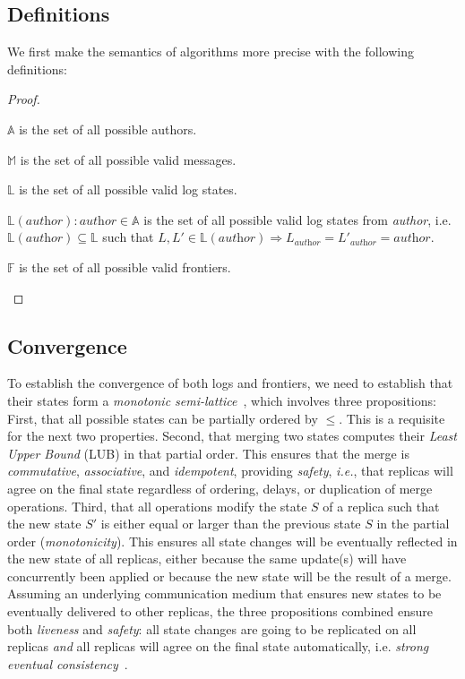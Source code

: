 \documentclass[9pt, oneside]{article}   	%
\begin{document}
\subsection{Definitions}

We first make the semantics of algorithms more precise with the following definitions:
\begin{proof}
	\begin{pfenum}
		\item $\mathds{A}$ is the set of all possible authors.
		\item $\mathds{M}$ is the set of all possible valid messages.
		\item $\mathds{L}$ is the set of all possible valid log states.
		\item $\mathds{L}(\textit{author}) : \textit{author} \in \mathds{A}$ is the set of all possible valid log states from \textit{author}, i.e. $\mathds{L}(\textit{author}) \subseteq \mathds{L}$ such that $L,L' \in \mathds{L}(\textit{author}) \Rightarrow L_\textit{author} = L'_\textit{author} = \textit{author}$.
		\item $\mathds{F}$ is the set of all possible valid frontiers.
	\end{pfenum}
\end{proof}

\subsection{Convergence}

To establish the convergence of both logs and frontiers, we need to establish that their states form a \textit{monotonic semi-lattice}~\cite{Shapiro2011CRDTs}, which involves three propositions: First, that all possible states can be partially ordered by $\leq$. This is a requisite for the next two properties. Second, that merging two states computes their \textit{Least Upper Bound} (LUB) in that partial order. This ensures that the merge is \textit{commutative}, \textit{associative}, and \textit{idempotent}, providing \textit{safety}, \textit{i.e.}, that replicas will agree on the final state regardless of ordering, delays, or duplication of merge operations. Third, that all operations modify the state $S$ of a replica such that the new state $S'$ is either equal or larger than the previous state $S$ in the partial order (\textit{monotonicity}). This ensures all state changes will be eventually reflected in the new state of all replicas, either because the same update(s) will have concurrently been applied or because the new state will be the result of a merge. Assuming an underlying communication medium that ensures new states to be eventually delivered to other replicas, the three propositions combined ensure both \textit{liveness} and \textit{safety}: all state changes are going to be replicated on all replicas \textit{and} all replicas will agree on the final state automatically, i.e. \textit{strong eventual consistency}~\cite{Shapiro2011CRDTs}.
\end{document}
